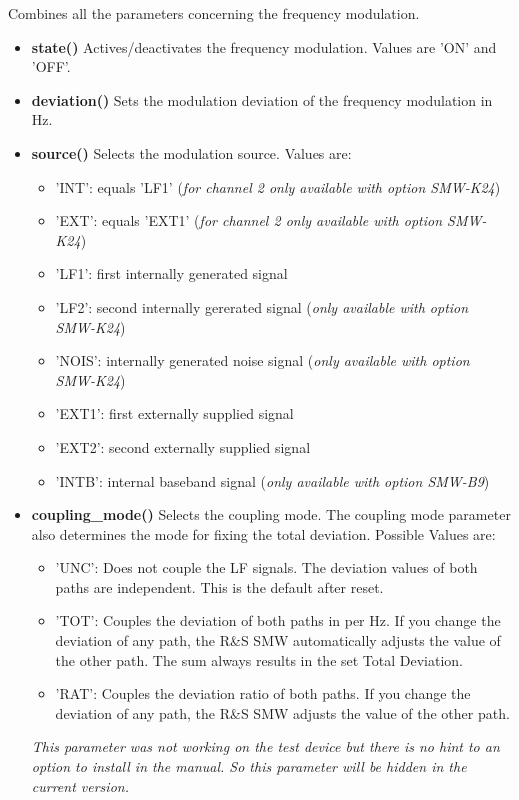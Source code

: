\documentclass[11pt]{article} %
\begin{document}
Combines all the parameters concerning the frequency modulation.
\begin{itemize}
\item {\bf state()} Actives/deactivates the frequency modulation. Values are 'ON' and 'OFF'.
\item {\bf deviation()} Sets the modulation deviation of the frequency modulation in Hz.
\item {\bf source()} Selects the modulation source. Values are:
	\begin{itemize}[]
	\item 'INT': equals 'LF1' ({\it for channel 2 only available with option SMW-K24})
	\item 'EXT': equals 'EXT1' ({\it for channel 2 only available with option SMW-K24})
	\item 'LF1': first internally generated signal
	\item 'LF2': second internally gererated signal ({\it only available with option SMW-K24})
	\item 'NOIS': internally generated noise signal ({\it only available with option SMW-K24})
	\item 'EXT1': first externally supplied signal
	\item 'EXT2': second externally supplied signal
	\item 'INTB': internal baseband signal ({\it only available with option SMW-B9})
	\end{itemize}
\item {\bf coupling\_mode()} Selects the coupling mode. The coupling mode parameter also determines the mode for fixing the total deviation. Possible Values are:
	\begin{itemize}[]
	\item 'UNC': Does not couple the LF signals. The deviation values of both paths are independent. This is the default after reset.
	\item 'TOT': Couples the deviation of both paths in per Hz. If you change the deviation of any path, the R\&S SMW automatically adjusts the value of the other path. The sum always results in the set Total Deviation.
	\item 'RAT': Couples the deviation ratio of both paths. If you change the deviation of any path, the R\&S SMW adjusts the value of the other path.
	\end{itemize}
	{\it This parameter was not working on the test device but there is no hint to an option to install in the manual. So this parameter will be hidden in the current version.}

\end{itemize}
\end{document}
